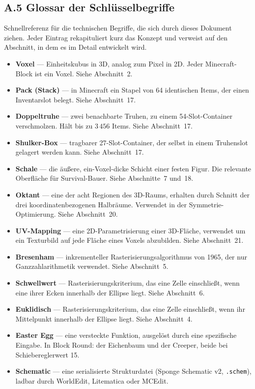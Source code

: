 \documentclass[12pt,a4paper]{scrartcl}
\newcommand{\code}[1]{\texttt{\small #1}}
\begin{document}
\subsection*{A.5 Glossar der Schlüsselbegriffe}

Schnellreferenz für die technischen Begriffe, die sich durch dieses Dokument ziehen. Jeder Eintrag rekapituliert kurz das Konzept und verweist auf den Abschnitt, in dem es im Detail entwickelt wird.

\begin{itemize}[leftmargin=1.4em,itemsep=0.18em,topsep=0.3em]
  \item \textbf{Voxel} --- Einheitskubus in 3D, analog zum Pixel in 2D. Jeder Minecraft-Block ist ein Voxel. Siehe Abschnitt~2.
  \item \textbf{Pack (Stack)} --- in Minecraft ein Stapel von 64 identischen Items, der einen Inventarslot belegt. Siehe Abschnitt~17.
  \item \textbf{Doppeltruhe} --- zwei benachbarte Truhen, zu einem 54-Slot-Container verschmolzen. Hält bis zu $3\,456$ Items. Siehe Abschnitt~17.
  \item \textbf{Shulker-Box} --- tragbarer 27-Slot-Container, der selbst in einem Truhenslot gelagert werden kann. Siehe Abschnitt~17.
  \item \textbf{Schale} --- die äußere, ein-Voxel-dicke Schicht einer festen Figur. Die relevante Oberfläche für Survival-Bauer. Siehe Abschnitte~7 und~18.
  \item \textbf{Oktant} --- eine der acht Regionen des 3D-Raums, erhalten durch Schnitt der drei koordinatenbezogenen Halbräume. Verwendet in der Symmetrie-Optimierung. Siehe Abschnitt~20.
  \item \textbf{UV-Mapping} --- eine 2D-Parametrisierung einer 3D-Fläche, verwendet um ein Texturbild auf jede Fläche eines Voxels abzubilden. Siehe Abschnitt~21.
  \item \textbf{Bresenham} --- inkrementeller Rasterisierungsalgorithmus von 1965, der nur Ganzzahlarithmetik verwendet. Siehe Abschnitt~5.
  \item \textbf{Schwellwert} --- Rasterisierungskriterium, das eine Zelle einschließt, wenn eine ihrer Ecken innerhalb der Ellipse liegt. Siehe Abschnitt~6.
  \item \textbf{Euklidisch} --- Rasterisierungskriterium, das eine Zelle einschließt, wenn ihr Mittelpunkt innerhalb der Ellipse liegt. Siehe Abschnitt~4.
  \item \textbf{Easter Egg} --- eine versteckte Funktion, ausgelöst durch eine spezifische Eingabe. In Block Round: der Eichenbaum und der Creeper, beide bei Schiebereglerwert 15.
  \item \textbf{Schematic} --- eine serialisierte Strukturdatei (Sponge Schematic v2, \code{.schem}), ladbar durch WorldEdit, Litematica oder MCEdit.
\end{itemize}
\end{document}
